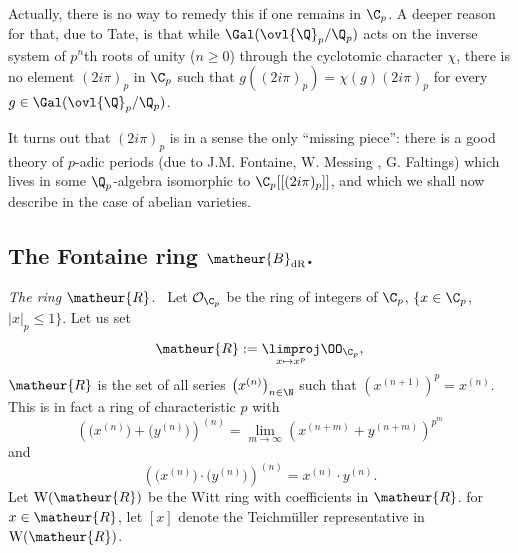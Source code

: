 \begin{para}
 Actually, there is no way to remedy this if one remains in $\C_p$.  A
 deeper reason for that, due to Tate, is that while
 $\Gal({\ovl{\Q}}_p/{\Q}_p)$ acts on the inverse system of $p^n$th
 roots of unity ($n \geq 0$) through the cyclotomic character $\chi$,
 there is no element $(2i\pi)_p$ in $\C_p$ such that $g((2i\pi)_p)=\chi
 (g) (2i\pi)_p$ for every $g \in \Gal({\ovl{\Q}}_p/{\Q}_p)$.

 \noindent It turns out that $(2i\pi)_p$ is in a sense the only
 ``missing piece'': there is a good theory of $p$-adic periods (due to
 J.M. Fontaine, W. Messing \cite{ppapec}, G. Faltings) which lives in
 some ${\Q}_p$-algebra 
 isomorphic to $\C_p[[(2i\pi)_p]]$, and which we shall now describe in the
 case of abelian varieties.
\end{para}

\subsection{The Fontaine ring $\matheur{B}_{\mathrm{dR}}$.}
\begin{para}
 {\itshape The ring $\matheur{R}$.\ }
 Let $\mathcal{O}_{\C_p}$ be the ring of
 integers of $\C_p$, \ie $\{x \in \C_p$, $|x|_p \leq 1\}$.  Let us set
 \begin{equation*}
  \matheur{R}:=\underset{x\mapsto x^p}{\limproj}
   \OO_{\C_p},
 \end{equation*}
 \ie $\matheur{R}$ is the set of all series
 $\left(x^{(n)}\right)_{n\in\N}$
 such that $\left(x^{(n+1)}\right)^p=x^{(n)}$.
 This is in fact a ring of characteristic $p$ with 
 \begin{equation*}
  \left(\bigl(x^{(n)}\bigr)+\bigl(y^{(n)}\bigr)\right)^{(n)}=
   \lim_{m\rightarrow\infty}\left(x^{(n+m)}+y^{(n+m)}\right)^{p^m}
 \end{equation*}
 and
 \begin{equation*}
  \left(\bigl(x^{(n)}\bigr)\cdot\bigl(y^{(n)}\bigr)\right)^{(n)}=
   x^{(n)}\cdot y^{(n)}.
 \end{equation*}
 Let $\mathrm{W}(\matheur{R})$ be the Witt ring with coefficients in
 $\matheur{R}$. for $x\in \matheur{R}$, let $[x]$ denote the Teichm\"uller
 representative in $\mathrm{W}(\matheur{R})$.
\end{para}

